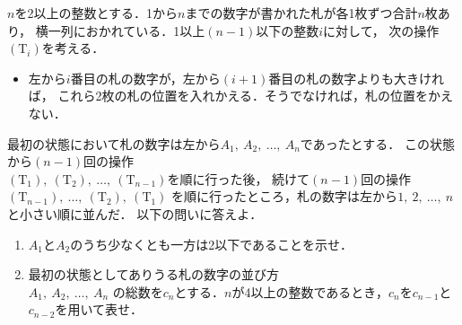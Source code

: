 ﻿\documentclass[../../../uem_mat_tok_q.tex]{subfiles}
\begin{document}
    $n$を2以上の整数とする．1から$n$までの数字が書かれた札が各1枚ずつ合計$n$枚あり，%
    横一列におかれている．1以上$(n-1)$以下の整数$i$に対して，%
    次の操作$(\mathrm{T}_i)$を考える．
    \begin{itemize}[label={$(\mathrm{T}_i)$}, leftmargin=4\zw, labelsep=.7\zw, topsep=2pt]
        \item 左から$i$番目の札の数字が，左から$(i+1)$番目の札の数字よりも大きければ，%
            これら2枚の札の位置を入れかえる．そうでなければ，札の位置をかえない．
    \end{itemize}

    最初の状態において札の数字は左から$A_1,\:A_2,\:\dots,\:A_n$であったとする．%
    この状態から$(n-1)$回の操作\\
    $(\mathrm{T}_1),\:(\mathrm{T}_2),\:\dots,\:(\mathrm{T}_{n-1})$を順に行った後，%
    続けて$(n-1)$回の操作$(\mathrm{T}_{n-1}),\:\dots,\:(\mathrm{T}_2),\:(\mathrm{T}_1)$%
    を順に行ったところ，札の数字は左から$1,\:2,\:\dots,\:n$と小さい順に並んだ．%
    以下の問いに答えよ．

    \begin{enumerate}
        \item $A_1$と$A_2$のうち少なくとも一方は2以下であることを示せ．
        \item 最初の状態としてありうる札の数字の並び方\\
            $A_1,\:A_2,\:\dots,\:A_n$%
            の総数を$c_n$とする．$n$が4以上の整数であるとき，$c_n$を$c_{n-1}$と$c_{n-2}$を用いて表せ．
    \end{enumerate}
\end{document}
